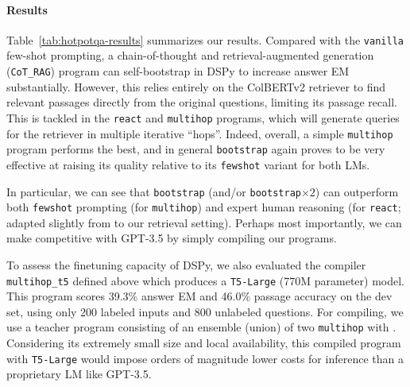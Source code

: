 

\paragraph{Results}\label{sec:qa-results}
Table~\ref{tab:hotpotqa-results} summarizes our results. Compared with the \texttt{vanilla} few-shot prompting, a chain-of-thought and retrieval-augmented generation (\texttt{CoT\_RAG}) program can self-bootstrap in DSPy to increase answer EM substantially. However, this relies entirely on the ColBERTv2 retriever to find relevant passages directly from the original questions, limiting its passage recall. This is tackled in the \texttt{react} and \texttt{multihop} programs, which will generate queries for the retriever in multiple iterative ``hops''. Indeed, overall, a simple \texttt{multihop} program performs the best, and in general \texttt{bootstrap} again proves to be very effective at raising its quality relative to its \texttt{fewshot} variant for both LMs.

In particular, we can see that \texttt{bootstrap} (and/or \texttt{bootstrap$\times2$}) can outperform both \texttt{fewshot} prompting (for \texttt{multihop}) and expert human reasoning (for \texttt{react}; adapted slightly from \citet{yao2022react} to our retrieval setting). Perhaps most importantly, we can make \llamaThirteenChat{} competitive with GPT-3.5 by simply compiling our programs. %

To assess the finetuning capacity of DSPy, we also evaluated the compiler \texttt{multihop\_t5} defined above which produces a \texttt{T5-Large} (770M parameter) model. This program scores 39.3\% answer EM and 46.0\% passage accuracy on the dev set, using only 200 labeled inputs and 800 unlabeled questions. For compiling, we use a teacher program consisting of an ensemble (union) of two \texttt{multihop} with \llamaThirteenChat{}. Considering its extremely small size and local availability, this compiled program with \texttt{T5-Large} would impose orders of magnitude lower costs for inference than a proprietary LM like GPT-3.5.



